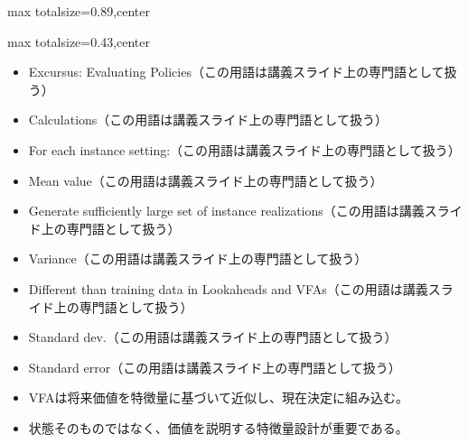 \begin{minipage}[t]{0.58\textwidth}
\begin{adjustbox}{max totalsize={\textwidth}{0.89\textheight},center}
\begin{minipage}{\textwidth}
\end{minipage}
\end{adjustbox}
\end{minipage}


\clearpage
{}
\begin{minipage}[t]{0.405\textwidth}
\begin{adjustbox}{max totalsize={\textwidth}{0.43\textheight},center}
\begin{minipage}{\textwidth}\scriptsize
{}\begin{itemize}
\item Excursus: Evaluating Policies（この用語は講義スライド上の専門語として扱う）
\item Calculations（この用語は講義スライド上の専門語として扱う）
\item For each instance setting:（この用語は講義スライド上の専門語として扱う）
\item Mean value（この用語は講義スライド上の専門語として扱う）
\item Generate sufficiently large set of instance realizations（この用語は講義スライド上の専門語として扱う）
\item Variance（この用語は講義スライド上の専門語として扱う）
\item Different than training data in Lookaheads and VFAs（この用語は講義スライド上の専門語として扱う）
\item Standard dev.（この用語は講義スライド上の専門語として扱う）
\item Standard error（この用語は講義スライド上の専門語として扱う）
\end{itemize}\begin{itemize}
\item VFAは将来価値を特徴量に基づいて近似し、現在決定に組み込む。
\item 状態そのものではなく、価値を説明する特徴量設計が重要である。
\end{itemize}
\end{minipage}
\end{adjustbox}
\end{minipage}\hfill

